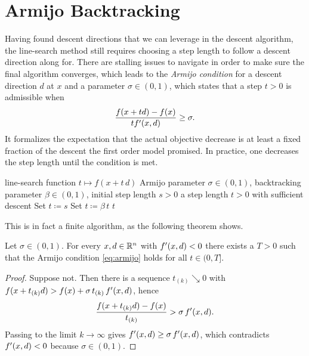 \documentclass{article}
\newcommand{\iter}[2]{#1_{(#2)}}           %
\begin{document}
\section{Armijo Backtracking}
\label{section:armijo}
Having found descent directions that we can leverage in the descent algorithm, the line-search method still requires choosing a step length to follow a descent direction along for.
There are stalling issues to navigate in order to make sure the final algorithm converges, which leads to the \emph{Armijo condition} for a descent direction $d$ at $x$ and a parameter $\sigma \in (0, 1)$, which states that a step $t > 0$ is admissible when
\begin{equation}
	\label{eq:armijo}
		\frac{f(x + td) - f(x)}{tf'(x, d)} \ge \sigma.
\end{equation}
It formalizes the expectation that the actual objective decrease is at least a fixed fraction of the descent the first order model promised.
In practice, one decreases the step length until the condition is met.

\begin{algorithm} \hfill
	\label{algorithm:armijo}
	\begin{algorithmic}[1]
		\Require line-search function $t\mapsto f(x + t\,d)$
		\Require Armijo parameter $\sigma \in (0, 1)$, backtracking parameter $\beta \in (0, 1)$, initial step length $s > 0$
		\Ensure a step length $t > 0$ with sufficient descent
		\State Set $t \coloneqq s$
			\State Set $t \coloneqq \beta \, t$
		\EndWhile
		\State \Return $t$
	\end{algorithmic}
\end{algorithm}

This is in fact a finite algorithm, as the following theorem shows.

\begin{theorem}
	\label{theorem:armijo}
	Let $\sigma \in (0, 1)$. For every $x, d \in \mathbb{R}^n$ with $f'(x, d) < 0$ there exists a $T > 0$ such that the Armijo condition \eqref{eq:armijo} holds for all $t \in (0, T]$.
\end{theorem}

\begin{proof}
	Suppose not. Then there is a sequence $\iter{t}{k} \searrow 0$ with $f(x + \iter{t}{k} d) > f(x) + \sigma \, \iter{t}{k} \, \dderiv{x}{d}$, hence
	\begin{equation*}
		\frac{f(x + \iter{t}{k} d) - f(x)}{\iter{t}{k}} > \sigma \, \dderiv{x}{d}.
	\end{equation*}
	Passing to the limit $k \rightarrow \infty$ gives $f'(x, d) \ge \sigma \, f'(x, d)$, which contradicts $f'(x, d) < 0$ because $\sigma \in (0, 1)$.
\end{proof}
\end{document}
